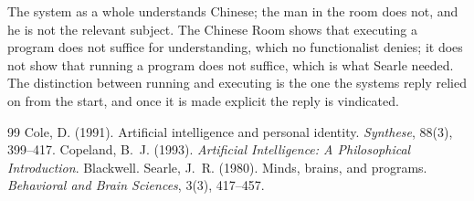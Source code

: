 \documentclass{situationist-preprint}
\begin{document}
The system as a whole understands Chinese; the man in the room does not, and he is not the relevant subject. The Chinese Room shows that executing a program does not suffice for understanding, which no functionalist denies; it does not show that running a program does not suffice, which is what Searle needed. The distinction between running and executing is the one the systems reply relied on from the start, and once it is made explicit the reply is vindicated.

\begin{thebibliography}{99}\small
{} Cole, D. (1991). Artificial intelligence and personal identity. \emph{Synthese}, 88(3), 399--417.
 Copeland, B.~J. (1993). \emph{Artificial Intelligence: A Philosophical Introduction}. Blackwell.
 Searle, J.~R. (1980). Minds, brains, and programs. \emph{Behavioral and Brain Sciences}, 3(3), 417--457.
\end{thebibliography}
\end{document}
